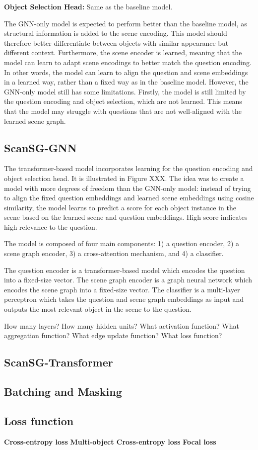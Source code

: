 \textbf{Object Selection Head:} Same as the baseline model.

The GNN-only model is expected to perform better than the baseline model, as structural information is added to the scene encoding. This model should therefore better differentiate between objects with similar appearance but different context. Furthermore, the scene encoder is learned, meaning that the model can learn to adapt scene encodings to better match the question encoding. In other words, the model can learn to align the question and scene embeddings in a learned way, rather than a fixed way as in the baseline model. However, the GNN-only model still has some limitations. Firstly, the model is still limited by the question encoding and object selection, which are not learned. This means that the model may struggle  with questions that are not well-aligned with the learned scene graph.

\subsection{ScanSG-GNN}

The transformer-based model incorporates learning for the question encoding and object selection head. It is illustrated in Figure XXX. The idea was to create a model with more degrees of freedom than the GNN-only model: instead of trying to align the fixed question embeddings and learned scene embeddings using cosine similarity, the model learns to predict a  score for each object instance in the scene based on the learned scene and question embeddings. High score indicates high relevance to the question.

The model is composed of four main components: 1) a question encoder, 2) a scene graph encoder, 3) a cross-attention mechanism, and 4) a classifier.

The question encoder is a transformer-based model which encodes the question into a fixed-size vector. The scene graph encoder is a graph neural network which encodes the scene graph into a fixed-size vector. The classifier is a multi-layer perceptron which takes the question and scene graph embeddings as input and outputs the most relevant object in the scene to the question.

How many layers? How many hidden units? What activation function? What aggregation function? What edge update function? What loss function?

\subsection{ScanSG-Transformer}

\subsection{Batching and Masking}

\subsection{Loss function}

\textbf{Cross-entropy loss}
\textbf{Multi-object Cross-entropy loss}
\textbf{Focal loss}